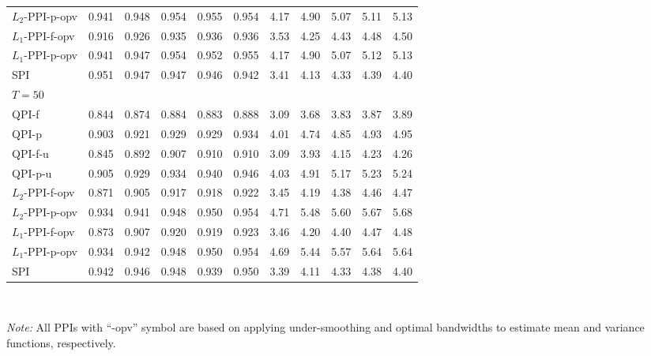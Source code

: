 \documentclass[a4paper]{article}
\begin{document}
\begin{table}[htbp]
\begin{tabular}{lcccccccccc}
  $L_2$-PPI-p-opv & 0.941 & 0.948 & 0.954 & 0.955 & 0.954 & 4.17 & 4.90 & 5.07 & 5.11 & 5.13 \\ 
  $L_1$-PPI-f-opv & 0.916 & 0.926 & 0.935 & 0.936 & 0.936 & 3.53 & 4.25 & 4.43 & 4.48 & 4.50 \\ 
  $L_1$-PPI-p-opv & 0.941 & 0.947 & 0.954 & 0.952 & 0.955 & 4.17 & 4.90 & 5.07 & 5.12 & 5.13  \\ 
  SPI &  0.951 & 0.947 & 0.947 & 0.946 & 0.942 & 3.41 & 4.13 & 4.33 & 4.39 & 4.40   \\  [3pt]
    $T = 50$        &       &       &       &       &  \\[3pt]
QPI-f & 0.844 & 0.874 & 0.884 & 0.883 & 0.888 & 3.09 & 3.68 & 3.83 & 3.87 & 3.89 \\ 
  QPI-p & 0.903 & 0.921 & 0.929 & 0.929 & 0.934 & 4.01 & 4.74 & 4.85 & 4.93 & 4.95 \\ 
  QPI-f-u & 0.845 & 0.892 & 0.907 & 0.910 & 0.910 & 3.09 & 3.93 & 4.15 & 4.23 & 4.26 \\ 
  QPI-p-u & 0.905 & 0.929 & 0.934 & 0.940 & 0.946 & 4.03 & 4.91 & 5.17 & 5.23 & 5.24 \\ 
  $L_2$-PPI-f-opv & 0.871 & 0.905 & 0.917 & 0.918 & 0.922 & 3.45 & 4.19 & 4.38 & 4.46 & 4.47 \\ 
  $L_2$-PPI-p-opv & 0.934 & 0.941 & 0.948 & 0.950 & 0.954 & 4.71 & 5.48 & 5.60 & 5.67 & 5.68\\ 
  $L_1$-PPI-f-opv & 0.873 & 0.907 & 0.920 & 0.919 & 0.923 & 3.46 & 4.20 & 4.40 & 4.47 & 4.48\\ 
  $L_1$-PPI-p-opv & 0.934 & 0.942 & 0.948 & 0.950 & 0.954 & 4.69 & 5.44 & 5.57 & 5.64 & 5.64 \\ 
  SPI & 0.942 & 0.946 & 0.948 & 0.939 & 0.950 & 3.39 & 4.11 & 4.33 & 4.38 & 4.40 \\ 
        \bottomrule
    \end{tabular}\\
      \raggedright
     \textit{Note:} All PPIs with ``-opv'' symbol are based on applying under-smoothing and optimal bandwidths to estimate mean and variance functions, respectively.
    
\end{table}


\FloatBarrier
\end{document}
